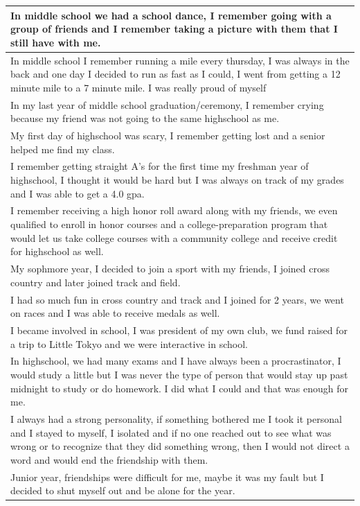 \documentclass[
  .7em,
  letterpaper,
  DIV=11,
  numbers=noendperiod]{scrartcl}
\begin{document}
\begin{table}
\begin{tabular}{l}
\hline
In middle school we had a school dance, I remember going with a group of friends and I remember taking a picture with them that I still have with me.\\
\hline
In middle school I remember running a mile every thursday, I was always in the back and one day I decided to run as fast as I could, I went from getting a 12 minute mile to a 7 minute mile. I was really proud of myself\\
\hline
In my last year of middle school graduation/ceremony, I remember crying because my friend was not going to the same highschool as me.\\
\hline
My first day of highschool was scary, I remember getting lost and a senior helped me find my class.\\
\hline
I remember getting straight A's for the first time my freshman year of highschool, I thought it would be hard but I was always on track of my grades and I was able to get a 4.0 gpa.\\
\hline
I remember receiving a high honor roll award along with my friends, we even qualified to enroll in honor courses and a college-preparation program that would let us take college courses with a community college and receive credit for highschool as well.\\
\hline
My sophmore year, I decided to join a sport with my friends, I joined cross country and later joined track and field.\\
\hline
I had so much fun in cross country and track and I joined for 2 years, we went on races and I was able to receive medals as well.\\
\hline
I became involved in school, I was president of my own club, we fund raised for a trip to Little Tokyo and we were interactive in school.\\
\hline
In highschool, we had many exams and I have always been a procrastinator, I would study a little but I was never the type of person that would stay up past midnight to study or do homework. I did what I could and that was enough for me.\\
\hline
I always had a strong personality, if something bothered me I took it personal and I stayed to myself, I isolated and if no one reached out to see what was wrong or to recognize that they did something wrong, then I would not direct a word and would end the friendship with them.\\
\hline
Junior year, friendships were difficult for me, maybe it was my fault but I decided to shut myself out and be alone for the year.\\

\end{tabular}
\end{table}
\end{document}
